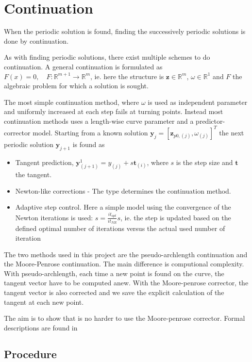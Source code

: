 

\section{Continuation}
\label{sec:continuation}

When the periodic solution is found, finding the successively periodic solutions
is done by continuation.

As with finding periodic solutions, there exist multiple schemes to do
continuation. A general continuation is formulated as $F(x)=0, \quad
F:\mathbb{R}^{m+1} \to \mathbb{R}^{m} $, ie. here the structure is $\bm z \in
\mathbb{R}^m$, $\omega \in \mathbb{R}^1$ and $F$ the algebraic problem for which
a solution is sought.

The most simple continuation method, where $\omega$ is used as independent
parameter and uniformly increased at each step fails at turning points. Instead
most continuation methods uses a length-wise curve parameter and a
predictor-corrector model. Starting from a known solution $\bm y_j = [\bm
z_{p0,(j)},\omega_{(j)}]^T$ the next periodic solution $\bm y_{j+1}$ is found as

\begin{itemize}
\item Tangent prediction, $\bm y_{(j+1)}^{1} = y_{(j)}+s\bm t_{(i)}$, where $s$
  is the step size and $\bm t$ the tangent.
\item Newton-like corrections - The type determines the continuation method.
\item Adaptive step control. Here a simple model using the convergence of the
  Newton iterations is used: $s = \frac{it_{opt}}{it_{NR}} s$, ie. the step is
  updated based on the defined optimal number of iterations versus the actual
  used number of iteration
\end{itemize}

The two methods used in this project are the pseudo-archlength continuation and
the Moore-Penrose continuation. The main difference is computional complexity.
With pseudo-archlength, each time a new point is found on the curve, the tangent
vector have to be computed anew. With the Moore-penrose corrector, the tangent
vector is also corrected and we save the explicit calculation of the tangent at
each new point.

The aim is to show that is no harder to use the Moore-penrose corrector. Formal
descriptions are found in \citet{dhooge2003a}

\subsection{Procedure}
\label{sec:cont_procedure}

